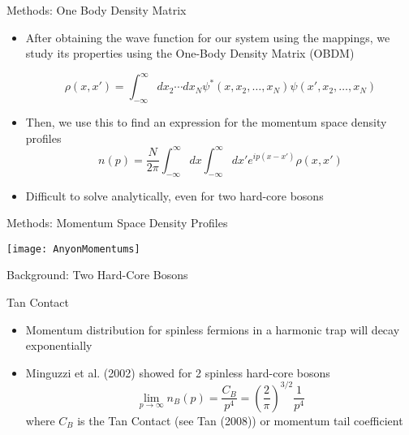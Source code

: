 \documentclass[12pt, usenames, dvipsnames]{beamer}
\begin{document}

\begin{frame}[t]{Methods: One Body Density Matrix}

\begin{itemize}
\item After obtaining the wave function for our system using the mappings, we study its properties using the One-Body Density Matrix (OBDM)

\[ \rho(x, x') = \int_{-\infty}^{\infty} dx_2 \cdots dx_N \psi^*(x,x_2,\ldots, x_N) \psi(x',x_2,\ldots, x_N) \]

\item Then, we use this to find an expression for the momentum space density profiles
\[ n(p) = \frac{N}{2\pi} \int_{-\infty}^{\infty} dx \int_{-\infty}^{\infty} dx'
		e^{ip(x-x')} \rho(x,x')  \]
\item Difficult to solve analytically, even for two hard-core bosons

\end{itemize}

\end{frame}


\begin{frame}[t]{Methods: Momentum Space Density Profiles}


\texttt{[image: AnyonMomentums]}


\end{frame}



\begin{frame}[t]{Background: Two Hard-Core Bosons}


\begin{block}{Tan Contact}
\begin{itemize}
\item Momentum distribution for spinless fermions in a harmonic trap will decay exponentially
\item Minguzzi et al. (2002) showed for 2 spinless hard-core bosons
\[ \lim_{p \rightarrow \infty} n_{B}(p) = \frac{C_{B}}{p^4} = \left( \frac{2}{\pi} \right)^{3/2} \frac{1}{p^4} \]
where $C_B$ is the Tan Contact (see Tan (2008)) or momentum tail coefficient
\end{itemize}
\end{block}


\end{frame}
\end{document}
